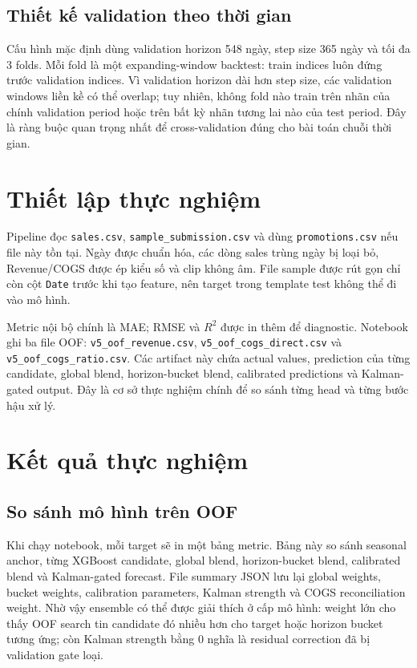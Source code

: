 \documentclass{article}
\begin{document}
\subsection{Thiết kế validation theo thời gian}

Cấu hình mặc định dùng validation horizon 548 ngày, step size 365 ngày và tối đa
3 folds. Mỗi fold là một expanding-window backtest: train indices luôn đứng
trước validation indices. Vì validation horizon dài hơn step size, các validation
windows liền kề có thể overlap; tuy nhiên, không fold nào train trên nhãn của
chính validation period hoặc trên bất kỳ nhãn tương lai nào của test period. Đây
là ràng buộc quan trọng nhất để cross-validation đúng cho bài toán chuỗi thời
gian.

\section{Thiết lập thực nghiệm}

Pipeline đọc \texttt{sales.csv}, \texttt{sample\_submission.csv} và dùng
\texttt{promotions.csv} nếu file này tồn tại. Ngày được chuẩn hóa, các dòng sales
trùng ngày bị loại bỏ, Revenue/COGS được ép kiểu số và clip không âm. File sample
được rút gọn chỉ còn cột \texttt{Date} trước khi tạo feature, nên target trong
template test không thể đi vào mô hình.

Metric nội bộ chính là MAE; RMSE và $R^2$ được in thêm để diagnostic. Notebook
ghi ba file OOF: \texttt{v5\_oof\_revenue.csv},
\texttt{v5\_oof\_cogs\_direct.csv} và \texttt{v5\_oof\_cogs\_ratio.csv}. Các
artifact này chứa actual values, prediction của từng candidate, global blend,
horizon-bucket blend, calibrated predictions và Kalman-gated output. Đây là cơ
sở thực nghiệm chính để so sánh từng head và từng bước hậu xử lý.

\section{Kết quả thực nghiệm}

\subsection{So sánh mô hình trên OOF}

Khi chạy notebook, mỗi target sẽ in một bảng metric. Bảng này so sánh seasonal
anchor, từng XGBoost candidate, global blend, horizon-bucket blend, calibrated
blend và Kalman-gated forecast. File summary JSON lưu lại global weights, bucket
weights, calibration parameters, Kalman strength và COGS reconciliation weight.
Nhờ vậy ensemble có thể được giải thích ở cấp mô hình: weight lớn cho thấy OOF
search tin candidate đó nhiều hơn cho target hoặc horizon bucket tương ứng; còn
Kalman strength bằng 0 nghĩa là residual correction đã bị validation gate loại.
\end{document}
